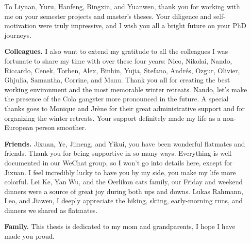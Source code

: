To Liyuan, Yuru, Hanfeng, Bingxin, and Yuanwen, thank you for working with me on your semester projects and master's theses. Your diligence and self-motivation were truly impressive, and I wish you all a bright future on your PhD journeys.

\noindent
\textbf{Colleagues.}
I also want to extend my gratitude to all the colleagues I was fortunate to share my time with over these four years: Nico, Nikolai, Nando, Riccardo, Cenek, Torben, Alex, Binbin, Yujia, Stefano, Andrés, Ozgur, Olivier, Ghjulia, Samantha, Corrine, and Manu. Thank you all for creating the best working environment and the most memorable winter retreats. Nando, let's make the presence of the Cola gangster more pronounced in the future. A special thanks goes to Monique and Jrène for their great administrative support and for organizing the winter retreats. Your support definitely made my life as a non-European person smoother. 

\noindent
\textbf{Friends.}
Jixuan, Ye, Jimeng, and Yikui, you have been wonderful flatmates and friends. Thank you for being supportive in so many ways. Everything is well documented in our WeChat group, so I won't go into details here, except for Jixuan. I feel incredibly lucky to have you by my side, you make my life more colorful. Lei Ke, Yan Wu, and the Oerlikon cats family, our Friday and weekend dinners were a source of great joy during both ups and downs. Lukas Rahmann, Leo, and Jiawen, I deeply appreciate the hiking, skiing, early-morning runs, and dinners we shared as flatmates.

\noindent
\textbf{Family.}
This thesis is dedicated to my mom and grandparents, I hope I have made you proud.